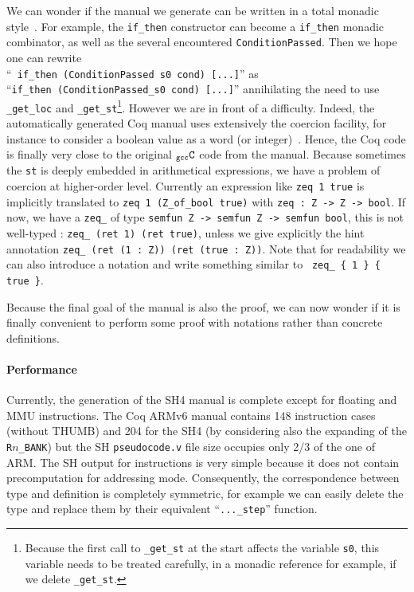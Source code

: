\documentclass[a4paper, 11pt]{article}
\newcommand{\gccC}{$_{\tt gcc}{\tt C}$\xspace}
\begin{document}
\hspace{1ex}

We can wonder if the manual we generate can be written in a total monadic style~\cite{conf/itp/FoxM10}. For example, the \verb|if_then| constructor can become a \verb|if_then| monadic combinator, as well as the several encountered \verb|ConditionPassed|. Then we hope one can rewrite \\
``{\tt <s0> if\_then (ConditionPassed s0 cond) [...]}'' as \\
 ``{\tt if\_then (ConditionPassed\_s0 cond) [...]}'' annihilating the need to use \verb|_get_loc| and \verb|_get_st|\footnote{Because the first call to {\tt \_get\_st} at the start affects the variable {\tt s0}, this variable needs to be treated carefully, in a monadic reference for example, if we delete {\tt \_get\_st}.}. However we are in front of a difficulty. Indeed, the automatically generated Coq manual uses extensively the coercion facility, for instance to consider a boolean value as a word (or integer)~\cite{arm}. Hence, the Coq code is finally very close to the original \gccC code from the manual. Because sometimes the \verb|st| is deeply embedded in arithmetical expressions, we 
have a problem of coercion at higher-order level. Currently an
expression like
\verb|zeq 1 true| is implicitly translated to \verb|zeq 1 (Z_of_bool true)|
with \verb|zeq : Z -> Z -> bool|.
If now, we have a \verb|zeq_| of type \verb|semfun Z -> semfun Z -> semfun bool|,
this is not well-typed :
\verb|zeq_ (ret 1) (ret true)|,
unless we give explicitly the hint annotation
\verb|zeq_ (ret (1 : Z)) (ret (true : Z))|.
Note that for readability we can also introduce a notation and write
something similar to \verb| zeq_ { 1 } { true }|.

Because the final goal of the manual is also the proof, we can now wonder if it is finally convenient to perform some proof with notations rather than concrete definitions.

\paragraph{Performance}
Currently, the generation of the SH4 manual is complete except for floating and MMU instructions. The Coq ARMv6 manual contains 148 instruction cases (without THUMB) and 204 for the SH4 (by considering also the expanding of the \verb|R|$n$\verb|_BANK|) but the SH {\tt pseudocode.v} file size occupies only 2/3 of the one of ARM. The SH output for instructions is very simple because it does not contain precomputation for addressing mode. Consequently, the correspondence between type and definition is completely symmetric, for example we can easily delete the type and replace them by their equivalent ``\verb|..._step|'' function.
\end{document}
